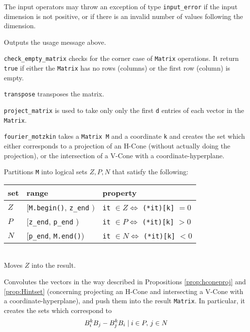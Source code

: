 \lstInputError
The input operators may throw an exception of type \lstinline{input_error} if the input dimension is not positive, or if there is an invalid number of values following the dimension.

\lstUsage
Outputs the usage message above.

\lstCheckEmpty
\lstinline{check_empty_matrix} checks for the corner case of \lstinline{Matrix} operations.  It return \lstinline{true} if either the \lstinline{Matrix} has no rows (columns) or the first row (column) is empty.

\lstTranspose
\lstinline{transpose} transposes the matrix.

\lstProjectM
\lstinline{project_matrix} is used to take only only the first \lstinline{d} entries of each vector in the \lstinline{Matrix}.

\lstFME
\lstinline{fourier_motzkin} takes a \lstinline{Matrix M} and a coordinate \lstinline{k} and creates the set which either corresponds to a projection of an H-Cone (without actually doing the projection), or the intersection of a V-Cone with a coordinate-hyperplane.

\lstFMEPart
Partitions \lstinline{M} into logical sets $Z,P,N$ that satisfy the following:\\

\begin{tabular}{|l|l|l|}
  \hline
set & range & property \\
  \hline
  $Z$ & [\lstinline|M.begin()|, \lstinline|z_end| $)$ & 
      \lstinline|it| $\in Z \Leftrightarrow$ \lstinline|(*it)[k]| $ = 0$ \\
  \hline
  $P$ & [\lstinline|z_end|, \lstinline|p_end| ) & 
      \lstinline|it| $\in P \Leftrightarrow$ \lstinline|(*it)[k]| $ > 0$ \\
  \hline
  $N$ & [\lstinline|p_end|, \lstinline|M.end()|) & 
      \lstinline|it| $\in N \Leftrightarrow$ \lstinline|(*it)[k]| $ < 0$ \\
  \hline
\end{tabular}\\

\lstFMEMove
Moves $Z$ into the result.

\lstFMEConvolute
Convolutes the vectors in the way described in Propositions \ref{prop:hconeproj} and \ref{prop:Hintset} (concerning projecting an H-Cone and intersecting a V-Cone with a coordinate-hyperplane), and push them into the result \lstinline{Matrix}.  In particular, it creates the sets which correspond to
\[ B^k_i B_j - B^k_j B_i \;|\; i \in P,\, j \in N \\ \]

